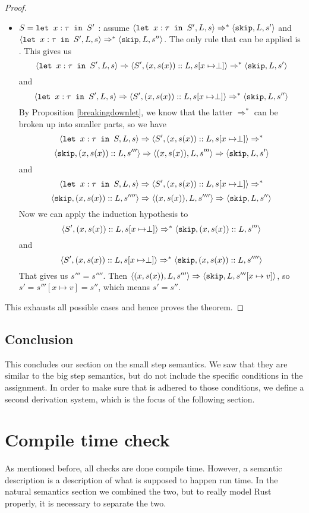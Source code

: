 \begin{proof}
\begin{itemize}[noitemsep]
    \item $S = \texttt{let }x : \tau \texttt{ in } S'$ : assume $\langle \texttt{let }x : \tau \texttt{ in } S', L, s \rangle \Rightarrow ^{*} \langle \texttt{skip}, L, s' \rangle$ and $\langle \texttt{let }x : \tau \texttt{ in } S', L, s \rangle \Rightarrow ^{*} \langle \texttt{skip}, L, s'' \rangle$. The only rule that can be applied is . This gives us
    $$\langle \texttt{let }x : \tau \texttt{ in } S', L, s \rangle \Rightarrow \langle S', (x,s(x))::L, s[x\mapsto \perp] \rangle \Rightarrow ^{*} \langle \texttt{skip}, L, s' \rangle$$
    and 
    $$\langle \texttt{let }x : \tau \texttt{ in } S', L, s \rangle \Rightarrow \langle S', (x,s(x))::L, s[x\mapsto \perp] \rangle \Rightarrow ^{*} \langle \texttt{skip}, L, s'' \rangle$$
    By Proposition \ref{breakingdownlet}, we know that the latter $\Rightarrow ^{*}$ can be broken up into smaller parts, so we have 
    $$\langle \texttt{let }x : \tau \texttt{ in } S, L, s \rangle \Rightarrow \langle S', (x,s(x))::L, s[x\mapsto \perp] \rangle \Rightarrow ^{*}$$ $$\langle \texttt{skip}, (x,s(x))::L, s''' \rangle \Rightarrow \langle (x,s(x)), L, s''' \rangle \Rightarrow \langle \texttt{skip}, L, s' \rangle$$
    and 
    $$\langle \texttt{let }x : \tau \texttt{ in } S, L, s \rangle \Rightarrow \langle S', (x,s(x))::L, s[x\mapsto \perp] \rangle \Rightarrow ^{*}$$ $$\langle \texttt{skip}, (x,s(x))::L, s'''' \rangle \Rightarrow \langle (x,s(x)), L, s'''' \rangle \Rightarrow \langle \texttt{skip}, L, s'' \rangle$$
    Now we can apply the induction hypothesis to 
    $$\langle S', (x,s(x))::L, s[x\mapsto \perp] \rangle \Rightarrow ^{*} \langle \texttt{skip}, (x,s(x))::L, s''' \rangle$$
    and 
    $$\langle S', (x,s(x))::L, s[x\mapsto \perp] \rangle \Rightarrow ^{*} \langle \texttt{skip}, (x,s(x))::L, s'''' \rangle$$
    That gives us $s''' = s''''$. Then $\langle (x,s(x)), L, s''' \rangle \Rightarrow \langle \texttt{skip}, L, s'''[x\mapsto v] \rangle$, so $s' = s'''[x\mapsto v] = s''$, which means $s'=s''$.
\end{itemize}
This exhausts all possible cases and hence proves the theorem.
\end{proof}

\subsection{Conclusion}
This concludes our section on the small step semantics. We saw that they are similar to the big step semantics, but do not include the specific conditions in the assignment. In order to make sure that is adhered to those conditions, we define a second derivation system, which is the focus of the following section. 

\section{Compile time check}
As mentioned before, all checks are done compile time. However, a semantic description is a description of what is supposed to happen run time. In the natural semantics section we combined the two, but to really model Rust properly, it is necessary to separate the two. 

